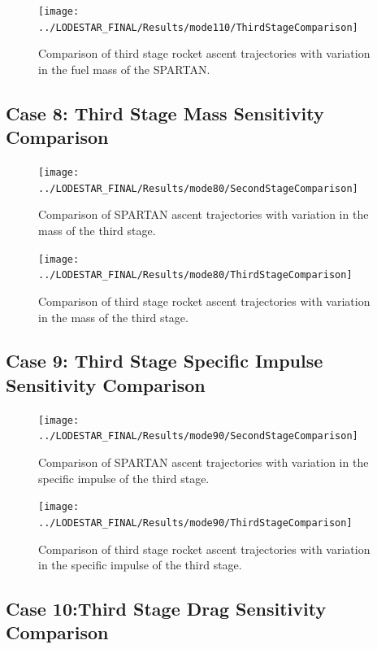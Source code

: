 \begin{figure}[!th]
\centering
\texttt{[image: ../LODESTAR\_FINAL/Results/mode110/ThirdStageComparison]}
\caption{Comparison of third stage rocket ascent trajectories with variation in the fuel mass of the SPARTAN.}
\label{fig:ThirdStageComparison5}
\end{figure}
\FloatBarrier
\clearpage
\subsection{Case 8: Third Stage Mass Sensitivity Comparison}\label{sec:app_comparison80}

\begin{figure}[!th]
\centering
\texttt{[image: ../LODESTAR\_FINAL/Results/mode80/SecondStageComparison]}
\caption{Comparison of SPARTAN ascent trajectories with variation in the mass of the third stage.}
\label{fig:SecondStageComparison6}
\end{figure}


\begin{figure}[!th]
\centering
\texttt{[image: ../LODESTAR\_FINAL/Results/mode80/ThirdStageComparison]}
\caption{Comparison of third stage rocket ascent trajectories with variation in the mass of the third stage.}
\label{fig:ThirdStageComparison6}
\end{figure}

\FloatBarrier
\clearpage
\subsection{Case 9: Third Stage Specific Impulse Sensitivity Comparison}\label{sec:app_comparison90}

\begin{figure}[!th]
	\centering
	\texttt{[image: ../LODESTAR\_FINAL/Results/mode90/SecondStageComparison]}
	\caption{Comparison of SPARTAN ascent trajectories with variation in the specific impulse of the third stage.}
	\label{fig:SecondStageComparison7}
\end{figure}

\begin{figure}[!th]
\centering
\texttt{[image: ../LODESTAR\_FINAL/Results/mode90/ThirdStageComparison]}
\caption{Comparison of third stage rocket ascent trajectories with variation in the specific impulse of the third stage.}
\label{fig:ThirdStageComparison7}
\end{figure}
\FloatBarrier
\clearpage
\subsection{Case 10:Third Stage Drag Sensitivity Comparison}\label{sec:app_comparison70}

